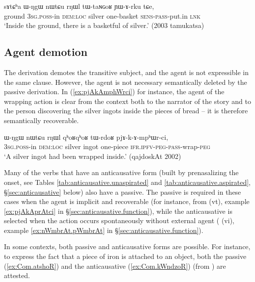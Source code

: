 \begin{exe}
\ex \label{ex:tWtaNGoR.YArku}
 \gll sɤtɕʰa ɯ-ŋgɯ nɯtɕu rŋɯl tɯ-taɴɢoʁ ɲɯ-ɤ-rku tɕe, \\
 ground \textsc{3sg}.\textsc{poss}-in \textsc{dem}:\textsc{loc} silver  one-basket \textsc{sens}-\textsc{pass}-put.in \textsc{lnk} \\
\glt `Inside the ground, there is a basketful of silver.' (2003 tamukatsa)
\end{exe} 

\subsection{Agent demotion} \label{sec:passive.agent}
The  derivation demotes the transitive subject, and the agent is not expressible in the same clause. However, the agent is not necessary semantically deleted by the passive derivation. In (\ref{ex:pjAkAmphWrci}) for instance, the agent of the wrapping action is clear from the context both to the narrator of the story and to the person discovering the silver ingots inside the pieces of bread -- it is therefore semantically recoverable.

\begin{exe}
\ex \label{ex:pjAkAmphWrci}
 \gll ɯ-ŋgɯ nɯtɕu rŋɯl qʰoʁqʰoʁ tɯ-rdoʁ pjɤ-k-ɤ-mpʰɯr-ci, \\
 \textsc{3sg}.\textsc{poss}-in \textsc{dem}:\textsc{loc} silver ingot one-piece \textsc{ifr}.\textsc{ipfv}-\textsc{peg}-\textsc{pass}-wrap-\textsc{peg} \\
 \glt `A silver ingot had been wrapped inside.' (qajdoskAt 2002)
\end{exe}

 
Many of the verbs that have an anticausative form (built by prenasalizing the onset, see Tables \ref{tab:anticausative.unaspirated} and \ref{tab:anticausative.aspirated}, §\ref{sec:anticausative} below) also have a passive. The passive is required in these cases when the agent is implicit and recoverable (for instance,  from  (vt), example \ref{ex:pjAkAprAtci} in §\ref{sec:anticausative.function}), while the anticausative is selected when the action occurs spontaneously without external agent ( (vi), example \ref{ex:nWmbrAt.pWmbrAt} in §\ref{sec:anticausative.function}).
 
 In some contexts, both passive and anticausative forms are possible. For instance, to express the fact that a piece of iron is attached to an object, both the passive  (\ref{ex:Com.atshoR}) and the anticausative   (\ref{ex:Com.kWndzoR}) (from 
) are attested.


